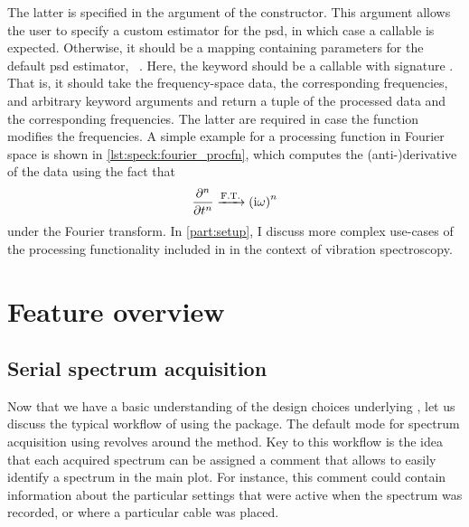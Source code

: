 The latter is specified in the  argument of the  constructor.
This argument allows the user to specify a custom estimator for the \gls{psd}, in which case a callable is expected.
Otherwise, it should be a mapping containing parameters for the default \gls{psd} estimator, ~.
Here, the keyword  should be a callable with signature .
That is, it should take the frequency-space data, the corresponding frequencies, and arbitrary keyword arguments and return a tuple of the processed data and the corresponding frequencies.
The latter are required in case the function modifies the frequencies.
A simple example for a processing function in Fourier space is shown in \cref{lst:speck:fourier_procfn}, which computes the \mbox{(anti-)}derivative of the data using the fact that
\begin{align}\label{eq:speck:fourier_derivative}
    \pdv[n]{t} \xrightarrow{\mathrm{F.T.}} \left(\mathrm{i}\omega\right)^n
\end{align}
under the Fourier transform.
In \cref{part:setup}, I discuss more complex use-cases of the processing functionality included in \pyspeck in the context of vibration spectroscopy.

\section{Feature overview}\label{sec:speck:software:features}
\subsection{Serial spectrum acquisition}\label{subsec:speck:software:features:serial}
Now that we have a basic understanding of the design choices underlying \pyspeck, let us discuss the typical workflow of using the package.
The default mode for spectrum acquisition using \pyspeck revolves around the  method.
Key to this workflow is the idea that each acquired spectrum can be assigned a comment that allows to easily identify a spectrum in the main plot.
For instance, this comment could contain information about the particular settings that were active when the spectrum was recorded, or where a particular cable was placed.

